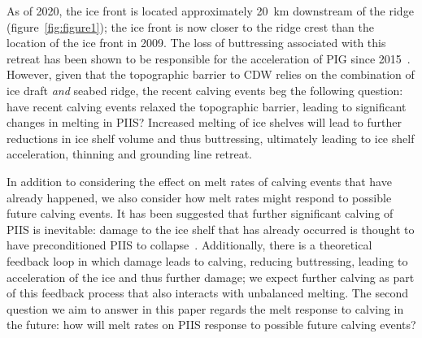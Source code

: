 \documentclass[draft]{agujournal2019}
\begin{document}
As of 2020, the ice front is located approximately 20~km downstream of the ridge (figure~\ref{fig:figure1}); the ice front is now closer to the ridge crest than the location of the ice front in 2009. The loss of buttressing associated with this retreat has been shown to be responsible for the acceleration of PIG since 2015~\cite{Joughin2021ScienceAdv}. However, given that the topographic barrier to CDW relies on the combination of ice draft \textit{and} seabed ridge, the recent calving events beg the following question: have recent calving events relaxed the topographic barrier, leading to significant changes in melting in PIIS? Increased melting of ice shelves will lead to further reductions in ice shelf volume and thus buttressing, ultimately leading to ice shelf acceleration, thinning and grounding line retreat.

In addition to considering the effect on melt rates of calving events that have already happened, we also consider how melt rates might respond to possible future calving events. It has been suggested that further significant calving of PIIS is inevitable: damage to the ice shelf that has already occurred is thought to have preconditioned PIIS to collapse~\cite{Lhermitte2020PNAS}. Additionally, there is a theoretical feedback loop in which damage leads to calving, reducing buttressing, leading to acceleration of the ice and thus further damage; we expect further calving as part of this feedback process that also interacts with unbalanced melting. The second question we aim to answer in this paper regards the melt response to calving in the future: how will melt rates on PIIS response to possible future calving events?
\end{document}
